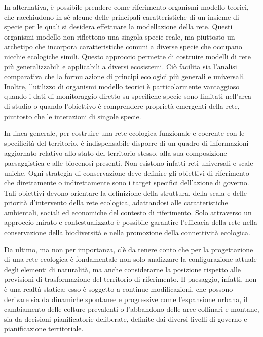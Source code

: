 \documentclass[
]{book}
\begin{document}
In alternativa, è possibile prendere come riferimento organismi modello
teorici, che racchiudono in sé alcune delle principali caratteristiche
di un insieme di specie per le quali si desidera effettuare la
modellazione della rete. Questi organismi modello non riflettono una
singola specie reale, ma piuttosto un archetipo che incorpora
caratteristiche comuni a diverse specie che occupano nicchie ecologiche
simili. Questo approccio permette di costruire modelli di rete più
generalizzabili e applicabili a diversi ecosistemi. Ciò facilita sia
l'analisi comparativa che la formulazione di principi ecologici più
generali e universali. Inoltre, l'utilizzo di organismi modello teorici
è particolarmente vantaggioso quando i dati di monitoraggio diretto su
specifiche specie sono limitati nell'area di studio o quando l'obiettivo
è comprendere proprietà emergenti della rete, piuttosto che le
interazioni di singole specie.

In linea generale, per costruire una rete ecologica funzionale e
coerente con le specificità del territorio, è indispensabile disporre di
un quadro di informazioni aggiornato relativo allo stato del territorio
stesso, alla sua composizione paesaggistica e alle biocenosi presenti.
Non esistono infatti reti universali e scale uniche. Ogni strategia di
conservazione deve definire gli obiettivi di riferimento che
direttamente o indirettamente sono i target specifici dell'azione di
governo. Tali obiettivi devono orientare la definizione della struttura,
della scala e delle priorità d'intervento della rete ecologica,
adattandosi alle caratteristiche ambientali, sociali ed economiche del
contesto di riferimento. Solo attraverso un approccio mirato e
contestualizzato è possibile garantire l'efficacia della rete nella
conservazione della biodiversità e nella promozione della connettività
ecologica.

Da ultimo, ma non per importanza, c'è da tenere conto che per la
progettazione di una rete ecologica è fondamentale non solo analizzare
la configurazione attuale degli elementi di naturalità, ma anche
considerarne la posizione rispetto alle previsioni di trasformazione del
territorio di riferimento. Il paesaggio, infatti, non è una realtà
statica: esso è soggetto a continue modificazioni, che possono derivare
sia da dinamiche spontanee e progressive come l'espansione urbana, il
cambiamento delle colture prevalenti o l'abbandono delle aree collinari
e montane, sia da decisioni pianificatorie deliberate, definite dai
diversi livelli di governo e pianificazione territoriale.
\end{document}
